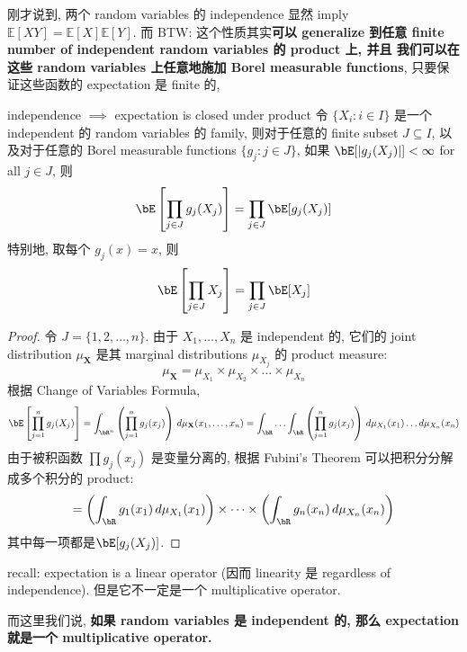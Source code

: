 刚才说到, 两个 random variables 的 independence 显然 imply 
$\mathbb{E}[XY] = \mathbb{E}[X]\mathbb{E}[Y]$.
而 BTW: 这个性质其实\textbf{可以 generalize 到任意
 finite number of independent random variables 的 product 上, 并且
 我们可以在这些 random variables 上任意地施加 Borel measurable functions}, 
 只要保证这些函数的 expectation 是 finite 的,
\begin{theorem}{independence \(\implies\) expectation is closed under product}
    令 \(\{X_i: i \in I\}\) 是一个 independent 的 random variables 的 family, 
    则对于任意的 finite subset \(J \subseteq I\), 以及对于任意的 Borel measurable functions \(\{g_j: j \in J\}\), 
    如果 \(\bE[|g_j(X_j)|] < \infty\) for all \(j \in J\), 则
    \[
    \bE\left[\prod_{j\in J} g_j(X_j)\right] = \prod_{j\in J} \bE[g_j(X_j)]
    \]
    特别地, 取每个 \(g_j(x) = x\), 则
    \[\bE\left[\prod_{j\in J} X_j\right] = \prod_{j\in J} \bE[X_j]\]
\end{theorem}
\begin{proof}
令 $J = \{1, 2, \dots, n\}$.
由于 $X_1, \dots, X_n$ 是 independent 的, 它们的 joint distribution
 $\mu_{\mathbf{X}}$ 是其 marginal distributions $\mu_{X_j}$ 的 product measure: $$\mu_{\mathbf{X}} = \mu_{X_1} \times \mu_{X_2} \times \dots \times \mu_{X_n}$$
根据 Change of Variables Formula, 
$$\bE\left[\prod_{j=1}^n g_j(X_j)\right] = \int_{\bR^n} 
\left( \prod_{j=1}^n g_j(x_j) \right) \, d\mu_{\mathbf{X}}(x_1, \dots, x_n)
= \int_{\bR} \dots \int_{\bR} \left( \prod_{j=1}^n g_j(x_j) \right) \, d\mu_{X_1}(x_1) \dots d\mu_{X_n}(x_n)
$$
由于被积函数 $\prod g_j(x_j)$ 是变量分离的, 根据 Fubini's Theorem 可以把积分分解成多个积分的 product:
$$= \left( \int_{\bR} g_1(x_1) \, d\mu_{X_1}(x_1) \right) \times \dots \times \left( \int_{\bR} g_n(x_n) \, d\mu_{X_n}(x_n) \right)$$
其中每一项都是$\bE[g_j(X_j)]$.
\end{proof}
\begin{remark}
recall: expectation is a linear operator (因而 linearity 是 regardless of independence).
但是它不一定是一个 multiplicative operator. 

而这里我们说, \textbf{如果 random variables 是 independent 的, 那么 expectation 就是一个 multiplicative operator.}
\end{remark}


